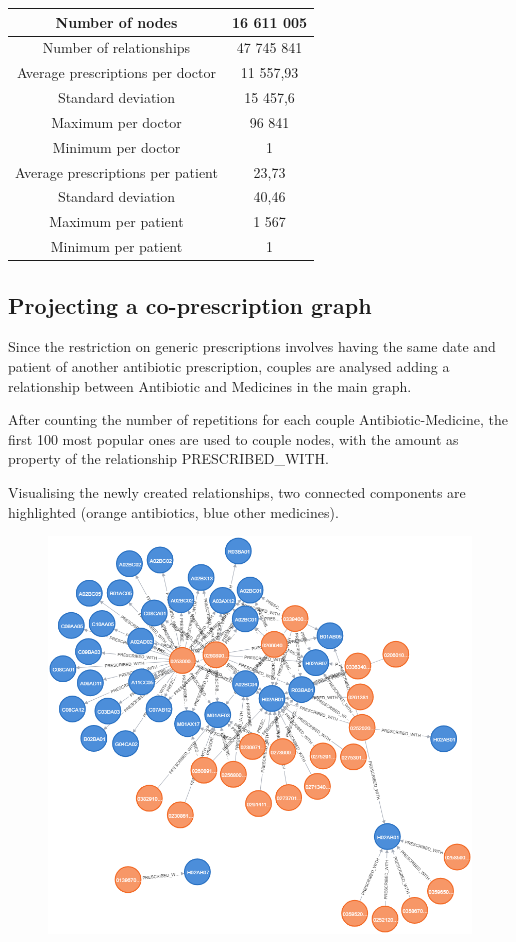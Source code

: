 \begin{center}
	\begin{tabular}{c|c}
		Number of nodes & 16 611 005 \\
		\hline
		Number of relationships & 47 745 841 \\
		\hline
		Average prescriptions per doctor & 11 557,93 \\
		\hline
		Standard deviation & 15 457,6 \\
		\hline
		Maximum per doctor & 96 841 \\
		\hline
		Minimum per doctor & 1 \\
		\hline
		Average prescriptions per patient & 23,73 \\
		\hline
		Standard deviation & 40,46 \\
		\hline
		Maximum per patient & 1 567 \\
		\hline
		Minimum per patient & 1
	\end{tabular}
\end{center}

\subsection{Projecting a co-prescription graph}
Since the restriction on generic prescriptions involves having the same date and patient of another antibiotic prescription, couples are analysed adding a relationship between Antibiotic and Medicines in the main graph.

After counting the number of repetitions for each couple Antibiotic-Medicine, the first 100 most popular ones are used to couple nodes, with the amount as property of the relationship PRESCRIBED\_WITH.

Visualising the newly created relationships, two connected components are highlighted (orange antibiotics, blue other medicines).

\begin{figure}[h]
	\centering
	\includegraphics[scale=0.4]{./images/couples-graph.png}
\end{figure}

